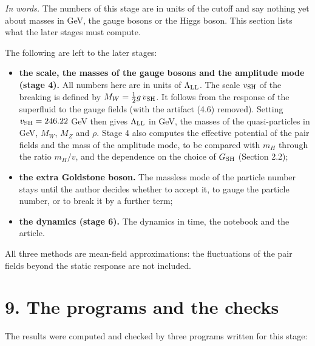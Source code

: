 \documentclass[
  10pt,
]{article}
\providecommand{\tightlist}{%
  \setlength{\itemsep}{0pt}\setlength{\parskip}{0pt}}
\begin{document}
\emph{In words.} The numbers of this stage are in units of the cutoff
and say nothing yet about masses in GeV, the gauge bosons or the Higgs
boson. This section lists what the later stages must compute.

The following are left to the later stages:

\begin{itemize}
\tightlist
\item
  \textbf{the scale, the masses of the gauge bosons and the amplitude
  mode (stage 4).} All numbers here are in units of
  \(\Lambda_{\rm LL}\). The scale \(v_{\rm SH}\) of the breaking is
  defined by \(M_W=\tfrac12g\,v_{\rm SH}\). It follows from the response
  of the superfluid to the gauge fields (with the artifact (4.6)
  removed). Setting \(v_{\rm SH}=246.22\) GeV then gives
  \(\Lambda_{\rm LL}\) in GeV, the masses of the quasi-particles in GeV,
  \(M_W\), \(M_Z\) and \(\rho\). Stage 4 also computes the effective
  potential of the pair fields and the mass of the amplitude mode, to be
  compared with \(m_H\) through the ratio \(m_H/v\), and the dependence
  on the choice of \(G_{\rm SH}\) (Section 2.2);
\item
  \textbf{the extra Goldstone boson.} The massless mode of the particle
  number stays until the author decides whether to accept it, to gauge
  the particle number, or to break it by a further term;
\item
  \textbf{the dynamics (stage 6).} The dynamics in time, the notebook
  and the article.
\end{itemize}

All three methods are mean-field approximations: the fluctuations of the
pair fields beyond the static response are not included.

\hypertarget{the-programs-and-the-checks}{%
\section{9. The programs and the
checks}\label{the-programs-and-the-checks}}

The results were computed and checked by three programs written for this
stage:
\end{document}
